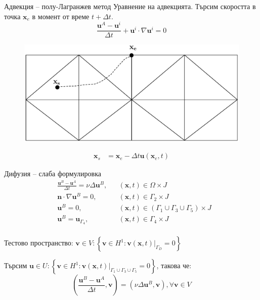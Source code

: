 \documentclass{beamer}
\newcommand{\dotprod}[2]{\left(#1, #2\right)}
\newcommand{\grad}[1]{\nabla#1}
\newcommand{\lapl}[1]{\Delta#1}
\newcommand{\vecf}[1]{\boldsymbol{#1}}
\begin{document}
\begin{frame}{Адвекция -- полу-Лагранжев метод}
    		Уравнение на адвекцията. Търсим скоростта в точка $\vecf{x}_e$ в момент от време $t + \Delta t$.
		$$
			\frac{\vecf{u}^A - \vecf{u}^i}{\Delta t} + \vecf{u}^i \cdot \nabla\vecf{u}^i = 0
		$$

\begin{figure}[H]
	\includegraphics[width=0.7\linewidth]{../../Figures/semi-lagrangian.pdf}
\end{figure}
\begin{align*}
\textbf{x}_s &= \textbf{x}_e - \Delta t \textbf{u}(\textbf{x}_e, t)
\end{align*}
\end{frame}
    
    
\begin{frame}{Дифузия -- слаба формулировка}
	\begin{align*}
		&\frac{\vecf{u}^B - \vecf{u}^A}{\Delta t} =\nu \Delta \vecf{u}^B, &&\left(\vecf{x}, t\right) \in \Omega \times J\\
		&\vecf{n} \cdot \grad{\vecf{u}^B} = 0, && \left(\vecf{x}, t\right) \in \Gamma_2 \times J \\
		&\vecf{u}^B = 0, &&\left(\vecf{x}, t\right) \in \left(\Gamma_1 \cup \Gamma_3 \cup \Gamma_5\right) \times J \\
		&\vecf{u}^B = \vecf{u}_{\Gamma_4}, && \left(\vecf{x}, t\right) \in \Gamma_4 \times J \\
	\end{align*}

	Тестово пространство: $\vecf{v} \in V : \left\{\vecf{v} \in H^1 : \vecf{v}(\vecf{x}, t)|_{\Gamma_D} = 0 \right\}$
	
	Търсим $\vecf{u} \in U : \left\{\vecf{v} \in H^1 : \vecf{v}(\vecf{x}, t)|_{\Gamma_1 \cup \Gamma_3 \cup \Gamma_5} = 0\right\}$, такова че:
	$$
	\dotprod{\frac{\vecf{u}^{B} - \vecf{u}^{A}}{\Delta t}}{\vecf{v}} = \dotprod{\nu\lapl{\vecf{u}^B}}{\vecf{v}}, \forall\vecf{v} \in V
	$$
\end{frame}
\end{document}
